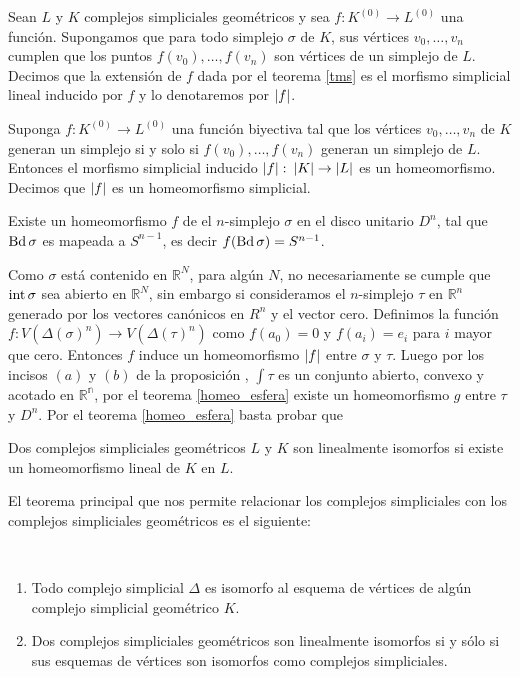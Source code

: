\begin{Defi}
Sean $L$ y $K$ complejos simpliciales geométricos y sea $f\colon K^{(0)} \rightarrow L^{(0)}$ una función. Supongamos que  para todo simplejo $\sigma$ de $K$, sus vértices $v_0,\ldots,v_n$ cumplen que los puntos $f(v_0),\ldots,f(v_n)$ son vértices de un simplejo de $L$. Decimos que la extensión de $f$ dada por el teorema \ref{tms} es el morfismo simplicial lineal inducido por $f$ y lo denotaremos por $\left| f \right|$.
\end{Defi}
\begin{Teo}
Suponga $f:K^{(0)}\rightarrow L^{(0)}$ una función biyectiva tal que los vértices $v_0,\ldots,v_n$ de $K$ generan un simplejo si y solo si $f(v_0),\ldots,f(v_n)$ generan un simplejo de $L$. Entonces el morfismo simplicial inducido $\left| f \right|\colon \left| K \right|\rightarrow\left| L \right|$ es un homeomorfismo. Decimos que $\left| f \right|$ es un homeomorfismo simplicial.
\end{Teo}

\begin{Col}
\item Existe un homeomorfismo $f$ de el $n$-simplejo $\sigma$ en el disco unitario $D^n$, tal que $\operatorname{Bd} \sigma$ es mapeada a $S^{n-1}$, es decir $f(\operatorname{Bd} \sigma) = S^{n-1}$.
\end{Col}
\begin{Dem}
Como $\sigma$ está contenido en $\mathbb{R}^N$, para algún $N$, no necesariamente se cumple que $\operatorname{int} \sigma$ sea abierto en $\mathbb{R}^N$, sin embargo si consideramos el $n$-simplejo $\tau$ en $\mathbb{R}^n$ generado por los vectores canónicos en $R^n$ y el vector cero. Definimos la función $f\colon V(\Delta(\sigma)^n) \to V(\Delta(\tau)^n)$ como $f(a_0) = 0$ y $f(a_i) = e_i$ para $i$ mayor que cero. Entonces $f$ induce un homeomorfismo $\left| f \right|$ entre $\sigma$ y $\tau$.
Luego por los  incisos $(a)$ y  $(b)$ de la proposición , $\int \tau$ es un conjunto abierto, convexo y acotado en $\mathbb{R^{n}}$, por el teorema \ref{homeo_esfera} existe un homeomorfismo $g$ entre $\tau$ y $D^n$.
Por el teorema \ref{homeo_esfera} basta probar que 
\end{Dem}

\begin{Defi}
Dos complejos simpliciales geométricos $L$ y $K$ son linealmente isomorfos si existe un homeomorfismo lineal de $K$ en $L$.
\end{Defi}
El teorema principal que nos permite relacionar los complejos simpliciales con los complejos simpliciales geométricos es el siguiente:
\begin{Teo}\label{tpc} 
~\begin{enumerate}
\item Todo complejo simplicial $\Delta$ es isomorfo al esquema de vértices de algún complejo simplicial geométrico $K$.
\item Dos complejos simpliciales geométricos son linealmente isomorfos si y sólo si sus esquemas de vértices son isomorfos como complejos simpliciales.
\end{enumerate}
\end{Teo}

